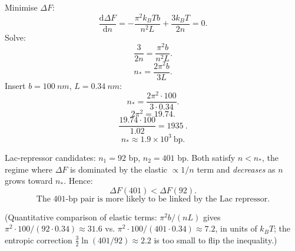 \documentclass[11pt]{article}
\newcommand{\de}{\mathrm{d}}
\begin{document}
\begin{center}
\end{center}

Minimise $\Delta F$:
\[ \frac{\de\Delta F}{\de n} = -\frac{\pi^2 k_B T b}{n^2 L} + \frac{3 k_B T}{2 n} = 0. \]
Solve:
\[ \frac{3}{2n} = \frac{\pi^2 b}{n^2 L}. \]
\[ n_* = \frac{2\pi^2 b}{3 L}. \]
Insert $b=\SI{100}{nm}$, $L=\SI{0.34}{nm}$:
\[ n_* = \frac{2\pi^2 \cdot 100}{3\cdot 0.34}. \]
\[ 2\pi^2 = 19.74. \]
\[ \frac{19.74 \cdot 100}{1.02} = \SI{1935}{}. \]
\begin{equation}
\boxed{\;n_* \approx 1.9\times 10^3\ \text{bp}.\;}
\end{equation}

Lac-repressor candidates: $n_1=92$ bp, $n_2=401$ bp. Both satisfy $n<n_*$, the regime where $\Delta F$ is dominated by the elastic $\propto 1/n$ term and \emph{decreases} as $n$ grows toward $n_*$. Hence:
\[ \Delta F(401) < \Delta F(92). \]
\begin{equation}
\boxed{\;\text{The 401-bp pair is more likely to be linked by the Lac repressor.}\;}
\end{equation}

(Quantitative comparison of elastic terms: $\pi^2 b/(nL)$ gives $\pi^2\cdot 100/(92\cdot 0.34) \approx 31.6$ vs. $\pi^2\cdot 100/(401\cdot 0.34)\approx 7.2$, in units of $k_B T$; the entropic correction $\tfrac32\ln(401/92)\approx 2.2$ is too small to flip the inequality.)
\end{document}
